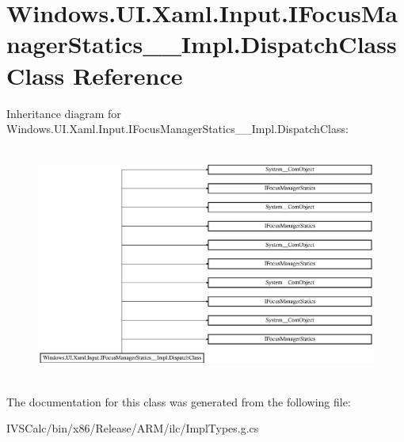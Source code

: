 \hypertarget{class_windows_1_1_u_i_1_1_xaml_1_1_input_1_1_i_focus_manager_statics_____impl_1_1_dispatch_class}{}\section{Windows.\+U\+I.\+Xaml.\+Input.\+I\+Focus\+Manager\+Statics\+\_\+\+\_\+\+Impl.\+Dispatch\+Class Class Reference}
\label{class_windows_1_1_u_i_1_1_xaml_1_1_input_1_1_i_focus_manager_statics_____impl_1_1_dispatch_class}
Inheritance diagram for Windows.\+U\+I.\+Xaml.\+Input.\+I\+Focus\+Manager\+Statics\+\_\+\+\_\+\+Impl.\+Dispatch\+Class\+:\begin{figure}[H]
\begin{center}
\leavevmode
\includegraphics[height=7.738694cm]{class_windows_1_1_u_i_1_1_xaml_1_1_input_1_1_i_focus_manager_statics_____impl_1_1_dispatch_class}
\end{center}
\end{figure}


The documentation for this class was generated from the following file\+:\begin{DoxyCompactItemize}
\item 
I\+V\+S\+Calc/bin/x86/\+Release/\+A\+R\+M/ilc/Impl\+Types.\+g.\+cs\end{DoxyCompactItemize}
